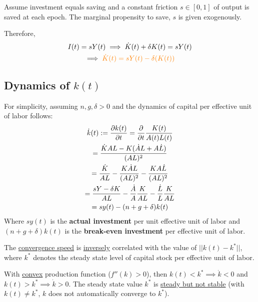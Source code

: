 \documentclass[]{article}
\begin{document}
			\begin{assumption}
				Assume investment equals saving and a constant friction $s \in [0, 1]$ of output is saved at each epoch. The marginal propensity to save, $s$ is given exogenously.
			\end{assumption}
			
			\par Therefore,
			\begin{gather*}
				I(t) = sY(t) \implies \dot{K}(t) + \delta K(t) = sY(t) \\
				\implies \textcolor{orange}{
					\dot{K}(t) = sY(t) - \delta(K(t))
					}
			\end{gather*}
			
			\subsection{Dynamics of $k(t)$}
				\par For simplicity, assuming $n, g, \delta > 0$ and the dynamics of capital per effective unit of labor follows: 
				\begin{gather*}
					\dot{k}(t) := \frac{\partial{k(t)}}{\partial{t}} = \frac{\partial{}}{\partial{t}} \frac{K(t)}{A(t)L(t)} \\
					= \frac{\dot{K}AL - K(\dot{A}L + A\dot{L})}{(AL)^2} \\
					= \frac{\dot{K}}{AL} - \frac{K\dot{A}L}{(AL)^2} - \frac{K A\dot{L}}{(AL)^2} \\
					= \frac{sY - \delta K}{AL} - \frac{\dot{A}}{A}\frac{K}{AL} - \frac{\dot{L}}{L} \frac{K}{AL} \\
					= sy(t) - (n + g + \delta) k(t)
				\end{gather*}
				Where $s y(t)$ is the \textbf{actual investment} per unit effective unit of labor and $(n + g + \delta) k(t)$ is the \textbf{break-even investment} per effective unit of labor.
				
			\begin{remark}
				The \ul{convergence speed} is \ul{inversely} correlated with the value of $|| k(t) - k^* ||$, where $k^*$ denotes the steady state level of capital stock per effective unit of labor.
			\end{remark}
			
			\begin{remark}
				With \ul{convex} production function ($f''(k) > 0$), then $k(t) < k^* \implies \dot{k} < 0$ and $k(t) > k^* \implies \dot{k} > 0$. The steady state value $k^*$ is \ul{steady but not stable} (with $k(t) \neq k^*$, $k$ does not automatically converge to $k^*$).
			\end{remark}
	
\end{document}

